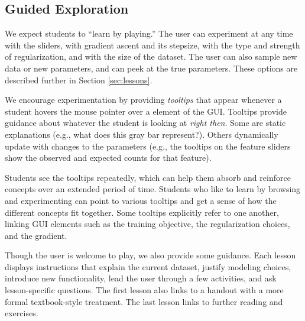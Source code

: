 \documentclass[11pt,letterpaper]{article}
\begin{document}
\subsection{Guided Exploration}

We expect students to ``learn by playing.''  The user can experiment
at any time with the sliders, with gradient ascent and its stepsize,
with the type and strength of regularization, and with the size of the
dataset.  The user can also sample new data or new parameters, and can
peek at the true parameters.  These options are described further
in Section \ref{sec:lessons}.


We encourage experimentation by providing \textit{tooltips} that
appear whenever a student hovers the mouse pointer over a element of
the GUI.  Tooltips provide guidance about whatever the student is
looking at \textit{right then}.  Some are static explanations (e.g.,
what does this gray bar represent?).  Others dynamically update with
changes to the parameters (e.g., the tooltips on the feature sliders
show the observed and expected counts for that feature).

Students see the tooltips repeatedly, which can help them absorb and
reinforce concepts over an extended period of time.  Students who like
to learn by browsing and experimenting can point to various tooltips
and get a sense of how the different concepts fit together.  Some
tooltips explicitly refer to one another, linking GUI elements such as
the training objective, the regularization choices, and the gradient.


Though the user is welcome to play, we also provide some guidance.
Each lesson displays instructions that explain the current dataset,
justify modeling choices, introduce new functionality, lead the user
through a few activities, and ask lesson-specific questions.  The
first lesson also links to a handout with a more formal textbook-style
treatment.  The last lesson links to further reading and exercises.

\end{document}
